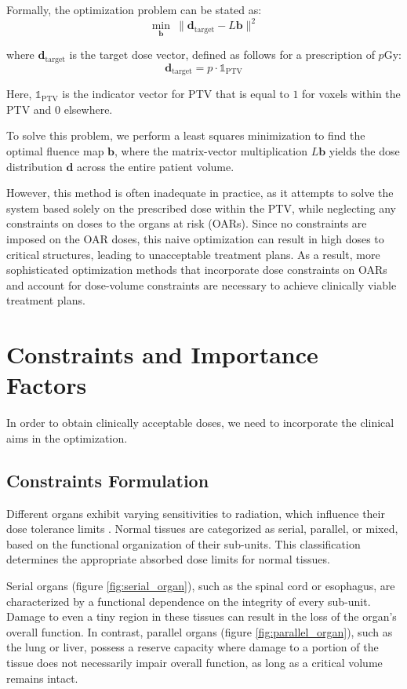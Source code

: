 Formally, the optimization problem can be stated as:
$$ \min_\mathbf{b} \ \| \mathbf{d}_{\text{target}} - L\mathbf{b} \|^2 $$

where $\mathbf{d}_{\text{target}}$ is the target dose vector, defined as follows for a prescription of $p$Gy:
$$ \mathbf{d}_{\text{target}} = p \cdot  \mathds{1}_{\text{PTV}} $$

Here, $\mathds{1}_{\text{PTV}}$ is the indicator vector for PTV that is equal to $1$ for voxels within the PTV and $0$ elsewhere.

To solve this problem, we perform a least squares minimization to find the optimal fluence map $\mathbf{b}$, where the matrix-vector multiplication $L\mathbf{b}$ yields the dose distribution $\mathbf{d}$ across the entire patient volume.

However, this method is often inadequate in practice, as it attempts to solve the system based solely on the prescribed dose within the PTV, while neglecting any constraints on doses to the organs at risk (OARs).
Since no constraints are imposed on the OAR doses, this naive optimization can result in high doses to critical structures, leading to unacceptable treatment plans.
As a result, more sophisticated optimization methods that incorporate dose constraints on OARs and account for dose-volume constraints are necessary to achieve clinically viable treatment plans.

\section{Constraints and Importance Factors}
In order to obtain clinically acceptable doses, we need to incorporate the clinical aims in the optimization.

\subsection{Constraints Formulation}
Different organs exhibit varying sensitivities to radiation, which influence their dose tolerance limits \cite{Withers1988} \cite{ICRU83}.
Normal tissues are categorized as serial, parallel, or mixed, based on the functional organization of their sub-units.
This classification determines the appropriate absorbed dose limits for normal tissues.

Serial organs (figure \ref{fig:serial_organ}), such as the spinal cord or esophagus, are characterized by a functional dependence on the integrity of every sub-unit.
Damage to even a tiny region in these tissues can result in the loss of the organ's overall function.
In contrast, parallel organs (figure \ref{fig:parallel_organ}), such as the lung or liver, possess a reserve capacity where damage to a portion of the tissue does not necessarily impair overall function, as long as a critical volume remains intact.

